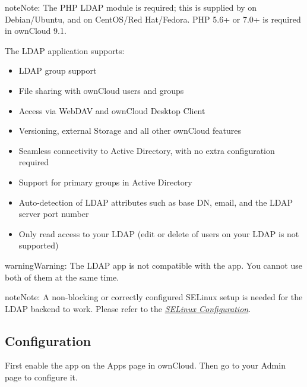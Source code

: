 \documentclass[letterpaper,10pt,english]{sphinxmanual}
\begin{document}
\begin{notice}{note}{Note:}
The PHP LDAP module is required; this is supplied by  on
Debian/Ubuntu, and  on CentOS/Red Hat/Fedora. PHP 5.6+ or 7.0+ is
required in ownCloud 9.1.
\end{notice}

The LDAP application supports:
\begin{itemize}
\item {} 
LDAP group support

\item {} 
File sharing with ownCloud users and groups

\item {} 
Access via WebDAV and ownCloud Desktop Client

\item {} 
Versioning, external Storage and all other ownCloud features

\item {} 
Seamless connectivity to Active Directory, with no extra configuration
required

\item {} 
Support for primary groups in Active Directory

\item {} 
Auto-detection of LDAP attributes such as base DN, email, and the LDAP server
port number

\item {} 
Only read access to your LDAP (edit or delete of users on your LDAP is not
supported)

\end{itemize}

\begin{notice}{warning}{Warning:}
The LDAP app is not compatible with the  app. You cannot use both of them at the same time.
\end{notice}

\begin{notice}{note}{Note:}
A non-blocking or correctly configured SELinux setup is needed
for the LDAP backend to work. Please refer to the {\hyperref[installation/selinux_configuration:selinux-config-label]{\emph{SELinux Configuration}}}.
\end{notice}


\subsection{Configuration}
\label{configuration_user/user_auth_ldap:configuration}
First enable the  app on the Apps page in
ownCloud. Then go to your Admin page to configure it.
\end{document}
